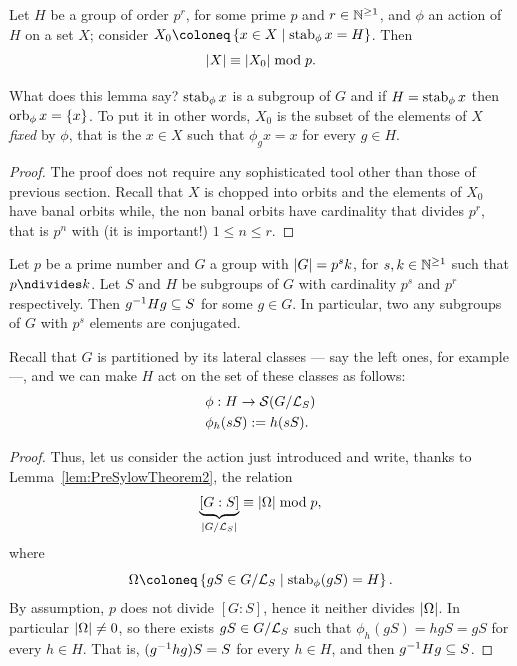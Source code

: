 \begin{lemma}\label{lem:PreSylowTheorem2}
Let \(H\) be a group of order \(p^r\), for some prime \(p\) and \(r \in \mathbb N^{\ge 1}\), and \(\phi\) an action of \(H\) on a set \(X\); consider \(X_0 \coloneq \set{x \in X \mid \stab_\phi x = H}\). Then
\[\left\lvert X\right\rvert \equiv \left\lvert X_0\right\rvert \bmod p .\]
\end{lemma}

What does this lemma say? \(\operatorname{stab}_\phi x\) is a subgroup of \(G\) and if \(H = \operatorname{stab}_\phi x\) then \(\operatorname{orb}_{\phi} x = \left\{x\right\}\). To put it in other words, \(X_0\) is the subset of the elements of \(X\) {\em fixed} by \(\phi\), that is the \(x \in X\) such that \(\phi_g x = x\) for every \(g \in H\). 

\begin{proof}
The proof does not require any sophisticated tool other than those of previous section. Recall that \(X\) is chopped into orbits and the elements of \(X_0\) have banal orbits while, the non banal orbits have cardinality that divides \(p^r\), that is \(p^n\) with (it is important!) \(1 \le n \le r\).
\end{proof}

\begin{proposition}\label{prop:SylowTheorem2}
Let \(p\) be a prime number and  \(G\) a group with \(\left\lvert G\right\rvert = p^s k\), for \(s, k \in \mathbb N^{\ge 1}\) such that \(p \ndivides k\). Let \(S\) and \(H\) be subgroups of \(G\) with cardinality \(p^s\) and \(p^r\) respectively. Then \(g^{-1} H g \subseteq S\) for some \(g \in G\). In particular, two any subgroups of \(G\) with \(p^s\) elements are conjugated.
\end{proposition}

Recall that \(G\) is partitioned by its lateral classes --- say the left ones, for example ---, and we can make \(H\) act on the set of these classes as follows:
\begin{align*}
& \phi : H \to \mathcal S(G/\mathcal L_S) \\
& \phi_h (sS) := h(sS) .
\end{align*}

\begin{proof} Thus, let us consider the action just introduced and write, thanks to Lemma~\ref{lem:PreSylowTheorem2}, the relation
\[\underbrace{[G:S]}_{\left\lvert G/\mathcal L_S\right\rvert} \equiv \left\lvert\Omega\right\rvert \bmod p ,\]
where
\[\Omega \coloneq \set{gS \in G/\call_S \mid \stab_\phi (gS) = H} .\]
By assumption, \(p\) does not divide \([G:S]\), hence it neither divides \(\left\lvert\Omega\right\rvert\). In particular \(\left\lvert\Omega\right\rvert \ne 0\), so there exists \(gS \in G/\mathcal L_S\) such that \(\phi_h(gS) = hgS = gS\) for every \(h \in H\). That is, \((g^{-1} h g) S = S\) for every \(h \in H\), and then \(g^{-1} H g \subseteq S\).
\end{proof}

